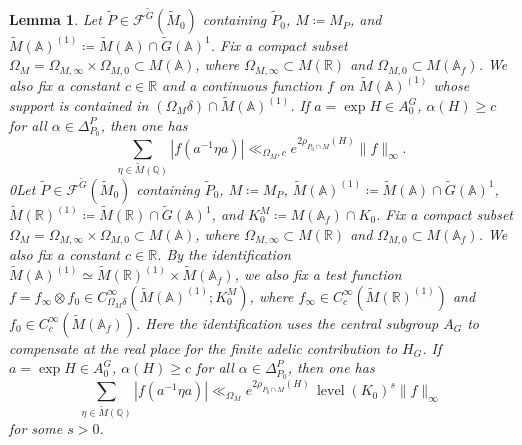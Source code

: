 \documentclass[12pt]{amsart}
\theoremstyle{definition}
\theoremstyle{plain}
\newtheorem{lemma}[definition]{Lemma}
\theoremstyle{remark}
\def\R{\mathbb{R}}%
\def\Q{\mathbb{Q}}%
\def\A{\mathbb{A}}%
\def\inf{\infty}
\newcommand{\cF}{\mathcal{F}}
\numberwithin{equation}{section}
\newcommand{\tG}{\widetilde{G}}
\newcommand{\tM}{\widetilde{M}}
\newcommand{\tP}{\widetilde{P}}
\newcommand{\level}{\operatorname{level}}
\begin{document}
\begin{lemma}\label{lem:cga-lattice}
Let $\tP\in\cF^{\tG}(\tM_0)$ containing $\tP_0$, $M\coloneqq M_P$, and $\tM(\A)^{(1)}\coloneqq \tM(\A)\cap\tG(\A)^1$. %
Fix a compact subset $\Omega_M=\Omega_{M,\infty}\times \Omega_{M,0}\subset M(\A)$, where $\Omega_{M,\infty}\subset M(\R)$ and $\Omega_{M,0}\subset M(\A_f)$.
We also fix a constant $c\in\R$ and a continuous function $f$ on $\tM(\A)^{(1)}$ whose support is contained in $(\Omega_M \delta)\cap \tM(\A)^{(1)}$. 
If $a=\exp H\in A_0^G$, $\alpha(H)\geq c$ for all $\alpha\in \Delta_{P_0}^P$, then one has
\[
\sum_{\eta\in \tM(\Q)} |f(  a^{-1}\eta a)|\ll_{\Omega_M,c} e^{2\rho_{P_0\cap M}(H)} \|f\|_\inf    .
\]
\if0Let $\tP\in\cF^{\tG}(\tM_0)$ containing $\tP_0$, $M\coloneqq M_P$, $\tM(\A)^{(1)}\coloneqq \tM(\A)\cap\tG(\A)^1$, $\tM(\R)^{(1)}\coloneqq \tM(\R)\cap\tG(\A)^1$, and $K_0^M\coloneqq M(\A_f)\cap K_0$. 
Fix a compact subset $\Omega_M=\Omega_{M,\infty}\times \Omega_{M,0}\subset M(\A)$, where $\Omega_{M,\infty}\subset M(\R)$ and $\Omega_{M,0}\subset M(\A_f)$. 
We also fix a constant $c\in\R$. 
By the identification $\tM(\A)^{(1)}\simeq \tM(\R)^{(1)}\times \tM(\A_f)$, 
we also fix a test function $f=f_\inf\otimes f_0\in C_{\Omega_M \delta}^\inf(\tM(\A)^{(1)};K_0^M)$, where $f_\inf\in C_c^\inf(\tM(\R)^{(1)})$ and $f_0\in C_c^\inf(\tM(\A_f))$. 
Here the identification uses the central subgroup $A_G$ to compensate at the real place for the finite adelic contribution to $H_G$.
If $a=\exp H\in A_0^G$, $\alpha(H)\geq c$ for all $\alpha\in \Delta_{P_0}^P$, then one has
\[
\sum_{\eta\in \tM(\Q)} |f(  a^{-1}\eta a)|\ll_{\Omega_M} e^{2\rho_{P_0\cap M}(H)} \, \level(K_0)^s \|f\|_\inf    
\]
for some $s>0$. \fi
\end{lemma}
\end{document}
